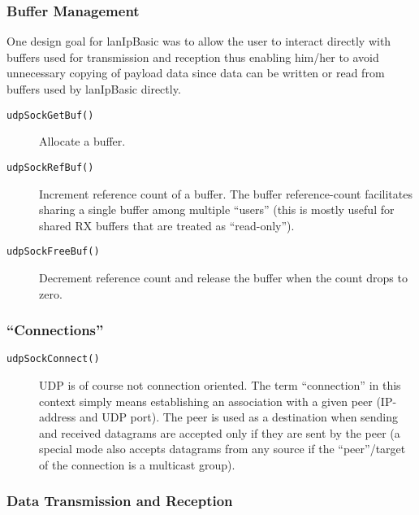 \documentclass{article}
\newcommand{\lip}{lanIpBasic}
\newcommand{\lipc}[1]{{\tt #1}}
\begin{document}
  \subsubsection{Buffer Management}
  One design goal for \lip{} was to allow the user to interact 
  directly with buffers used for transmission and reception thus
  enabling him/her to avoid unnecessary copying of payload data
  since data can be written or read from buffers used by \lip{}
  directly.
  \begin{description}
  \item[\lipc{udpSockGetBuf()}] Allocate a buffer.
  \item[\lipc{udpSockRefBuf()}] Increment reference count of
  a buffer. The buffer reference-count facilitates sharing
  a single buffer among multiple ``users'' (this is mostly useful
  for shared RX buffers that are treated as ``read-only'').
  \item[\lipc{udpSockFreeBuf()}] Decrement reference count and
  release the buffer when the count drops to zero.
  \end{description}

  \subsubsection{``Connections''}
  \begin{description}
  \item[\lipc{udpSockConnect()}] UDP is of course not connection
  oriented. The term ``connection'' in this context simply means
  establishing an association with a given peer (IP-address and
  UDP port). The peer is used as a destination when sending
  and received datagrams are accepted only if they are sent
  by the peer (a special mode also accepts datagrams from
  any source if the ``peer''/target of the connection is a
  multicast group).
  \end{description}

  \subsubsection{Data Transmission and Reception}
\end{document}
